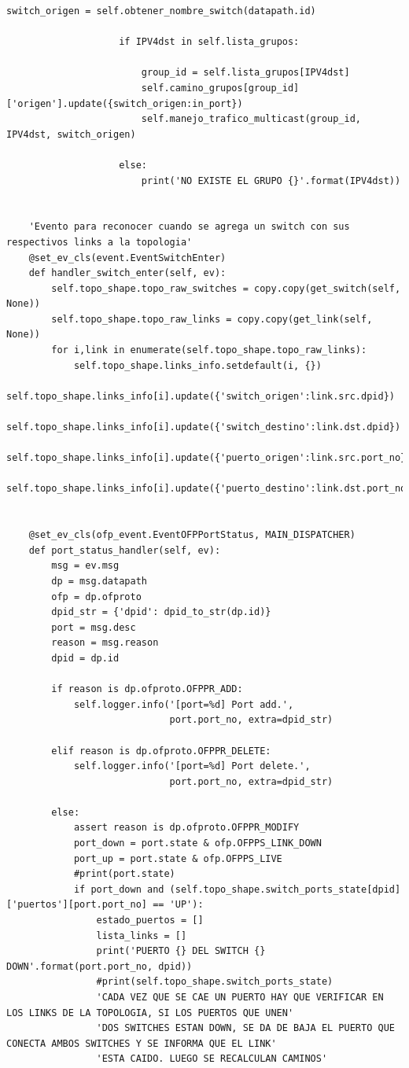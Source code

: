 \documentclass[12pt,a4paper,oneside]{book}
\begin{document}
\begin{lstlisting}[style=codigobase,  label = cod_correrP, caption= controlador.py]
                    switch_origen = self.obtener_nombre_switch(datapath.id)

                    if IPV4dst in self.lista_grupos:

                        group_id = self.lista_grupos[IPV4dst]
                        self.camino_grupos[group_id]['origen'].update({switch_origen:in_port})
                        self.manejo_trafico_multicast(group_id, IPV4dst, switch_origen)

                    else:
                        print('NO EXISTE EL GRUPO {}'.format(IPV4dst))


    'Evento para reconocer cuando se agrega un switch con sus respectivos links a la topologia'
    @set_ev_cls(event.EventSwitchEnter)
    def handler_switch_enter(self, ev):
        self.topo_shape.topo_raw_switches = copy.copy(get_switch(self, None))
        self.topo_shape.topo_raw_links = copy.copy(get_link(self, None))
        for i,link in enumerate(self.topo_shape.topo_raw_links):
            self.topo_shape.links_info.setdefault(i, {})
            self.topo_shape.links_info[i].update({'switch_origen':link.src.dpid})
            self.topo_shape.links_info[i].update({'switch_destino':link.dst.dpid})
            self.topo_shape.links_info[i].update({'puerto_origen':link.src.port_no})
            self.topo_shape.links_info[i].update({'puerto_destino':link.dst.port_no})


    @set_ev_cls(ofp_event.EventOFPPortStatus, MAIN_DISPATCHER)
    def port_status_handler(self, ev):
        msg = ev.msg
        dp = msg.datapath
        ofp = dp.ofproto
        dpid_str = {'dpid': dpid_to_str(dp.id)}
        port = msg.desc
        reason = msg.reason
        dpid = dp.id

        if reason is dp.ofproto.OFPPR_ADD:
            self.logger.info('[port=%d] Port add.',
                             port.port_no, extra=dpid_str)

        elif reason is dp.ofproto.OFPPR_DELETE:
            self.logger.info('[port=%d] Port delete.',
                             port.port_no, extra=dpid_str)

        else:
            assert reason is dp.ofproto.OFPPR_MODIFY
            port_down = port.state & ofp.OFPPS_LINK_DOWN
            port_up = port.state & ofp.OFPPS_LIVE
            #print(port.state)
            if port_down and (self.topo_shape.switch_ports_state[dpid]['puertos'][port.port_no] == 'UP'):
                estado_puertos = []
                lista_links = []
                print('PUERTO {} DEL SWITCH {} DOWN'.format(port.port_no, dpid))
                #print(self.topo_shape.switch_ports_state)
                'CADA VEZ QUE SE CAE UN PUERTO HAY QUE VERIFICAR EN LOS LINKS DE LA TOPOLOGIA, SI LOS PUERTOS QUE UNEN'
                'DOS SWITCHES ESTAN DOWN, SE DA DE BAJA EL PUERTO QUE CONECTA AMBOS SWITCHES Y SE INFORMA QUE EL LINK'
                'ESTA CAIDO. LUEGO SE RECALCULAN CAMINOS'


\end{lstlisting}
\end{document}
